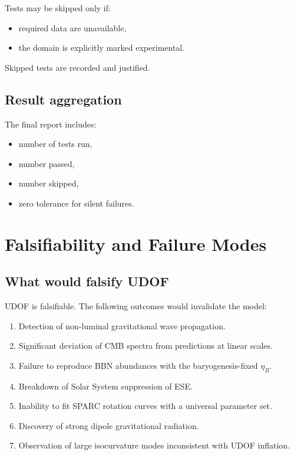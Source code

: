 \documentclass[11pt]{book}
\begin{document}
Tests may be skipped only if:
\begin{itemize}
\item required data are unavailable,
\item the domain is explicitly marked experimental.
\end{itemize}

Skipped tests are recorded and justified.

\section{Result aggregation}

The final report includes:
\begin{itemize}
\item number of tests run,
\item number passed,
\item number skipped,
\item zero tolerance for silent failures.
\end{itemize}

\chapter{Falsifiability and Failure Modes}

\section{What would falsify UDOF}

UDOF is falsifiable. The following outcomes would invalidate the model:

\begin{enumerate}
\item Detection of non-luminal gravitational wave propagation.
\item Significant deviation of CMB spectra from predictions at linear scales.
\item Failure to reproduce BBN abundances with the baryogenesis-fixed $\eta_B$.
\item Breakdown of Solar System suppression of ESE.
\item Inability to fit SPARC rotation curves with a universal parameter set.
\item Discovery of strong dipole gravitational radiation.
\item Observation of large isocurvature modes inconsistent with UDOF inflation.
\end{enumerate}
\end{document}
